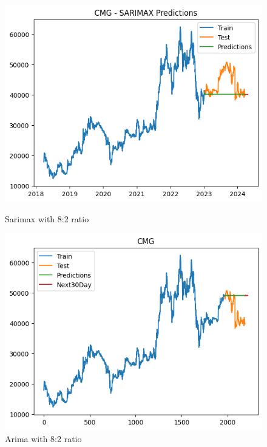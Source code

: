 \documentclass[conference]{IEEEtran}
\begin{document}
\begin{figure}[H]
    \centering
    \begin{minipage}{0.24\textwidth}
        \centering
        \includegraphics[width=\textwidth]{Figure/CMG/sarimax82.png}
        \caption{Sarimax with 8:2 ratio}
        \label{fig:image1}
    \end{minipage}
    \hfill
    \begin{minipage}{0.24\textwidth}
        \centering
        \includegraphics[width=\textwidth]{Figure/CMG/arima82.png}
        \caption{Arima with 8:2 ratio}
        \label{fig:image2}
    \end{minipage}
\end{figure}
\end{document}
